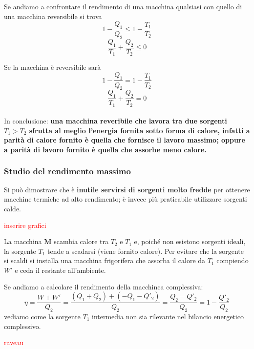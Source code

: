 \documentclass[x11names]{report}
\begin{document}
	\noindent
	Se andiamo a confrontare il rendimento di una macchina qualsiasi con quello di una macchina reversibile si trova
	\[ 
	1 - \frac{Q_{1}}{Q_{2}} \leq 1 - \frac{T_{1}}{T_{2}} 
	\]
	\begin{equation}
		\frac{Q_{1}}{T_{1}} + \frac{Q_{2}}{T_{2}} \leq 0
	\end{equation}
	
	Se la macchina è reversibile sarà 
	\[ 
	1 - \frac{Q_{1}}{Q_{2}} = 1 - \frac{T_{1}}{T_{2}} 
	\]
	\[ 
	\frac{Q_{1}}{T_{1}} + \frac{Q_{2}}{T_{2}} = 0
	\]
	\\
	
	\noindent
	In conclusione: \textbf{una macchina reveribile che lavora tra due sorgenti \(T_{1} > T_{2}\) sfrutta al meglio l'energia fornita sotto forma di calore, infatti a parità di calore fornito è quella che fornisce il  lavoro massimo; oppure a parità di lavoro fornito è quella che assorbe meno calore.}
	
	\subsubsection{Studio del rendimento massimo}
	Si può dimostrare che è \textbf{inutile servirsi di sorgenti molto fredde} per ottenere macchine termiche ad alto rendimento; è invece più praticabile utilizzare sorgenti calde.
	\begin{center}
		\textcolor{red}{inserire grafici}
	\end{center}
	La macchina \(\boldsymbol{M}\) scambia calore tra \(T_{2}\) e \(T_{1}\) e, poiché non esistono sorgenti ideali, la sorgente \(T_{1}\) tende a scadarsi (viene fornito calore). Per evitare che la sorgente si scaldi si installa una macchina frigorifera che assorba il calore da \(T_{1}\) compiendo \(W'\) e ceda il restante all'ambiente.
	
	Se andiamo a calcolare il rendimento della macchinca complessiva:
	\[ 
	\eta = \frac{W + W'}{Q_{2}} = \frac{(Q_{1} + Q_{2}) + (- Q_{1} - Q'_{2})}{Q_{2}} = \frac{Q_{2} - Q'_{2}}{Q_{2}} = 1 - \frac{Q'_{2}}{Q_{2}}
	\]
	vediamo come la sorgente \(T_{1}\) intermedia non sia rilevante nel bilancio energetico complessivo.
	
	\begin{center}
		\textcolor{red}{raveau}
	\end{center}
	
\end{document}

